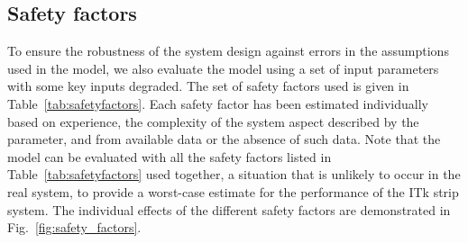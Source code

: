 \subsection{Safety factors}
\label{sec:safety_factors}
To ensure the robustness of the system design against errors in the assumptions used in the model, we also evaluate the model using a set of input parameters with some key inputs degraded. The set of safety factors used is given in Table~\ref{tab:safetyfactors}. Each safety factor has been estimated individually based on experience, the complexity of the system aspect described by the parameter, and from available data or the absence of such data. Note that the model can be evaluated with all the safety factors listed in Table~\ref{tab:safetyfactors} used together, a situation that is unlikely to occur in the real system, to provide a worst-case estimate for the performance of the ITk strip system. The individual effects of the different safety factors are demonstrated in Fig.~\ref{fig:safety_factors}.

\let\arraystretcha\arraystretch %
\renewcommand\arraystretch{1.2} %
\begin{table}[htb]
\caption{Safety factors.}
\label{tab:safetyfactors}
\centering
{} %
\end{table}
\let\arraystretch\arraystretcha %

